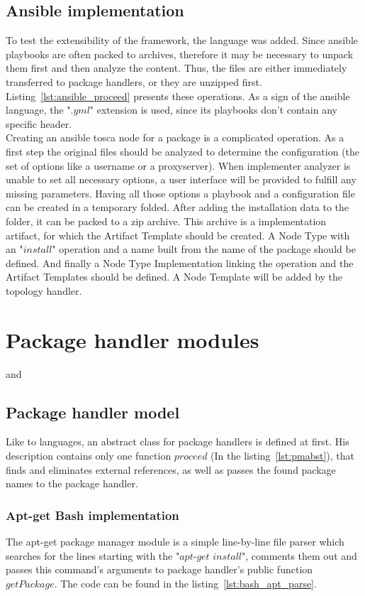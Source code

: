 \subsection*{Ansible implementation}
To test the extensibility of the framework, the  language was added.
Since ansible playbooks are often packed to archives, therefore it may be necessary to unpack them first and then analyze the content.
Thus, the files are either immediately transferred to package handlers, or they are unzipped first.
Listing~\ref{lst:ansible_proceed} presents these operations.
As a sign of the ansible language, the ".$yml$" extension is used, since its playbooks don't contain any specific header.\\
Creating an ansible \gls{tosca} node for a package is a complicated operation. 
As a first step the original files should be analyzed to determine the configuration (the set of options like a username or a proxyserver).
When implementer analyzer is unable to set all necessary options, a user interface will be provided to fulfill any missing parameters.
Having all those options a playbook and a configuration file can be created in a temporary folded.
After adding the installation data to the folder, it can be packed to a zip archive.
This archive is a implementation artifact, for which the Artifact Template should be created.
A Node Type with an "$install$" operation and a name built from the name of the package should be defined.
And finally a Node Type Implementation linking the operation and the Artifact Templates should be defined.
A Node Template will be added by the topology handler.

\section{Package handler modules}
 and 
\subsection*{Package handler model}
Like to languages, an abstract class for package handlers is defined at first.
His description contains only one function $proceed$ (In the listing~\ref{lst:pmabst}), that finds and eliminates external references, as well as passes the found package names to the package handler.
\subsubsection*{Apt-get Bash implementation}
The apt-get package manager module is a simple line-by-line file parser which searches for the lines starting with the "$apt$-$get$ $install$", comments them out and passes this command's arguments to package handler's public function $getPackage$. 
The code can be found in the listing~\ref{lst:bash_apt_parse}.
